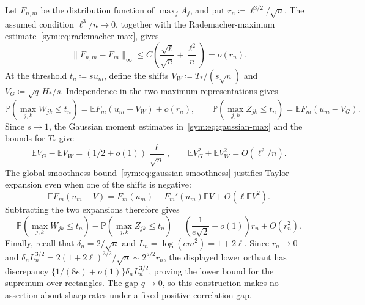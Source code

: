 \documentclass[11pt,letterpaper]{article}
\theoremstyle{remark}
\newcommand{\E}{\mathbb E}
\newcommand{\Pp}{\mathbb P}
\begin{document}
Let \(F_{n,m}\) be the distribution function of \(\max_jA_j\),
and put \(r_n\coloneqq\ell^{3/2}/\sqrt n\). The assumed condition
\(\ell^3/n\to0\), together with the Rademacher-maximum
estimate~\eqref{sym:eq:rademacher-max}, gives
\[
 \|F_{n,m}-F_m\|_\infty
 \le C\left(\frac{\sqrt\ell}{\sqrt n}+\frac{\ell^2}{n}\right)
 =o(r_n).
\]
At the threshold \(t_n\coloneqq s u_m\), define the shifts
\(V_W\coloneqq T_*/(s\sqrt n)\) and \(V_G\coloneqq\sqrt q\,H_*/s\).
Independence in the two maximum representations gives
\[
 \Pp(\max_{j,k}W_{jk}\le t_n)=\E F_m(u_m-V_W)+o(r_n),
 \qquad
 \Pp(\max_{j,k}Z_{jk}\le t_n)=\E F_m(u_m-V_G).
\]
Since \(s\to1\), the Gaussian moment estimates
in~\eqref{sym:eq:gaussian-max} and the bounds for \(T_*\) give
\[
 \E V_G-\E V_W=(1/2+o(1))\frac\ell{\sqrt n},
 \qquad \E V_G^2+\E V_W^2=O(\ell^2/n).
\]
The global smoothness bound~\eqref{sym:eq:gaussian-smoothness}
justifies Taylor expansion even when
one of the shifts is negative:
\[
 \E F_m(u_m-V)=F_m(u_m)-F_m'(u_m)\E V+O(\ell\E V^2).
\]
Subtracting the two expansions therefore gives
\[
 \Pp(\max_{j,k}W_{jk}\le t_n)-\Pp(\max_{j,k}Z_{jk}\le t_n)
 =\left(\frac1{e\sqrt2}+o(1)\right)r_n+O(r_n^2).
\]
Finally, recall that \(\delta_n=2/\sqrt n\) and
\(L_n=\log(em^2)=1+2\ell\). Since \(r_n\to0\) and
\(\delta_nL_n^{3/2}=2(1+2\ell)^{3/2}/\sqrt n\sim2^{5/2}r_n\),
the displayed lower orthant has discrepancy
\(\{1/(8e)+o(1)\}\delta_nL_n^{3/2}\), proving the lower bound
for the supremum over rectangles. The gap \(q\to0\), so this
construction makes no assertion about sharp rates under a fixed
positive correlation gap.
\end{document}
